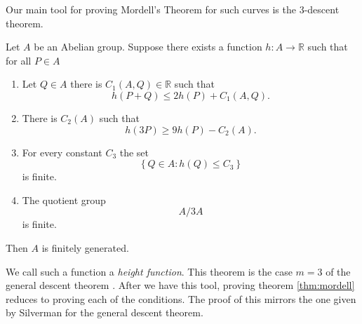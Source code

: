 Our main tool for proving Mordell's Theorem for such curves
is the $3$-descent theorem.
\begin{theorem} \label{thm:3descent}
  Let $A$ be an Abelian group.
  Suppose there exists a function
  $h: A \to \mathbb{R}$
  such that for all $P \in A$
  \begin{enumerate}
    \item Let $Q \in A$ there
      is $C_1(A, Q) \in \mathbb{R}$
      such that
      \begin{equation} \label{eq:boundHeight}
        h(P + Q) \leq 2h(P) + C_1(A, Q).
      \end{equation}
    \item There is $C_2(A)$ such that
      \begin{equation} \label{eq:boundMultipleHeight}
        h(3P) \geq 9 h(P) - C_2(A).
      \end{equation}
    \item For every constant $C_3$
      the set
      \begin{equation} \label{eq:finitePoints}
        \left\{ Q \in A : h(Q) \leq C_3 \right\}
      \end{equation}
      is finite.
    \item The quotient group
      \begin{equation} \label{eq:quotient}
        A/3A
      \end{equation}
      is finite.
  \end{enumerate}
  Then $A$ is finitely generated.
\end{theorem}
We call such a function a \textit{height function}.
This theorem is the case $m = 3$ of the general descent theorem
\cite[theorem 3.1]{silvermanArithmetic}.
After we have this tool, proving theorem \ref{thm:mordell}
reduces to proving each of the conditions.
The proof of this mirrors the one given
by Silverman for the general descent theorem.
